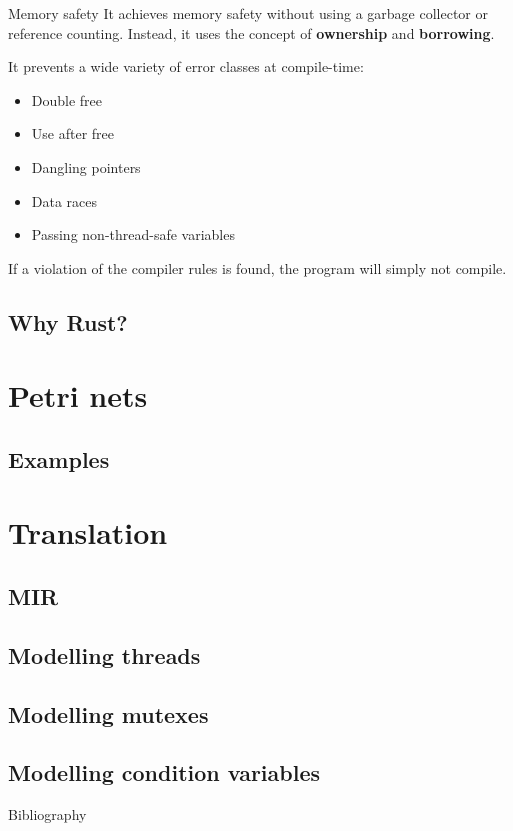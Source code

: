 \documentclass{beamer}
\begin{document}
\begin{frame}{Memory safety}
  It achieves memory safety without using a garbage collector or reference counting.
  Instead, it uses the concept of \textbf{ownership} and \textbf{borrowing}.

  \vfill
  \pause

  It prevents a wide variety of error classes at compile-time:

  \begin{itemize}
    \item Double free
    \item Use after free
    \item Dangling pointers
    \item Data races
    \item Passing non-thread-safe variables
  \end{itemize}

  \vfill

  If a violation of the compiler rules is found, the program will simply not compile.
\end{frame}

\subsection{Why Rust?}

\section{Petri nets}

\subsection{Examples}

\section{Translation}

\subsection{MIR}

\subsection{Modelling threads}

\subsection{Modelling mutexes}

\subsection{Modelling condition variables}

\begin{frame}{Bibliography}
  \tiny
  
  
\end{frame}
\end{document}
